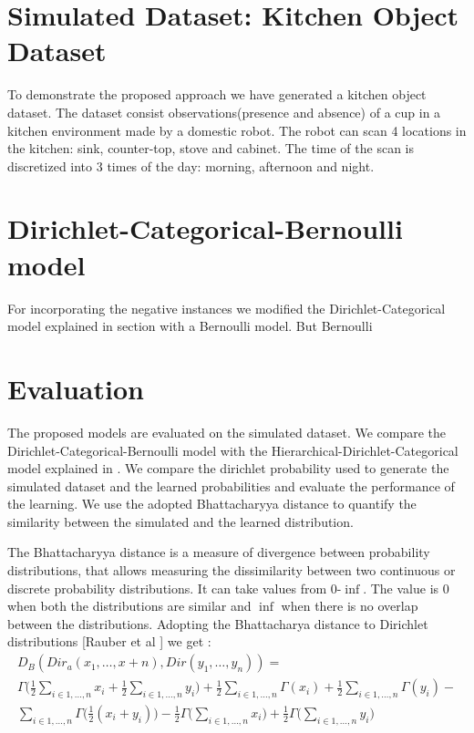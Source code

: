 \documentclass[11pt]{book}
\begin{document}
\section{Simulated Dataset: Kitchen Object Dataset}

To demonstrate the proposed approach we have generated a kitchen object dataset. The dataset consist observations(presence and absence) of a cup in a kitchen environment made by a domestic robot. The robot can scan 4 locations in the kitchen: sink, counter-top, stove and cabinet. The time of the scan is discretized into 3 times of the day: morning, afternoon and night. 

\section{Dirichlet-Categorical-Bernoulli model}

For incorporating the negative instances we modified the Dirichlet-Categorical model explained in section  with a Bernoulli model. But Bernoulli 

\section{Evaluation}

The proposed models are evaluated on the simulated dataset. We compare the Dirichlet-Categorical-Bernoulli model with the Hierarchical-Dirichlet-Categorical model explained in . We compare the dirichlet probability used to generate the simulated dataset and the learned probabilities and evaluate the performance of the learning. 
We use the adopted  Bhattacharyya distance  to quantify the similarity between the simulated and the learned distribution.

 The Bhattacharyya distance is a measure of divergence between
probability distributions, that allows measuring the dissimilarity between two continuous or discrete probability distributions. It can take values from 0-$\inf$. The value is 0 when both the distributions are similar and $\inf$ when there is no overlap between the distributions. Adopting the  Bhattacharya distance to Dirichlet distributions [Rauber et al ] we get :
\begin{multline}
	D_B(Dir_a(x_1, \dots ,x+n), Dir(y_1, \dots , y_n)) = \nonumber\\
	 \Gamma \Bigg( \frac{1}{2}  \sum_{i \in {1, \dots, n}} x_i +  \frac{1}{2}\sum_{i \in {1, \dots, n}} y_i\Bigg) + 
	\frac{1}{2}  \sum_{i \in {1, \dots, n}} \Gamma (x_i) + 
	\frac{1}{2}  \sum_{i \in {1, \dots, n}} \Gamma (y_i) - \\ 
	\sum_{i \in {1, \dots, n}} \Gamma \bigg(\frac{1}{2} (x_i + y_i) \bigg) - \frac{1}{2}  \Gamma \Bigg(  \sum_{i \in {1, \dots, n}} x_i \Bigg) + \frac{1}{2}  \Gamma \Bigg( \sum_{i \in {1, \dots, n}} y_i\Bigg)
\end{multline}
\end{document}
